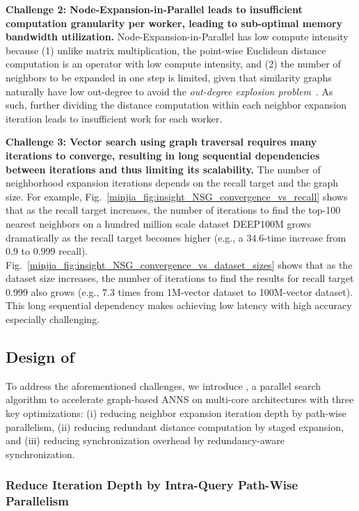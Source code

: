 \textbf{Challenge 2: Node-Expansion-in-Parallel leads to insufficient computation granularity per worker, leading to sub-optimal memory bandwidth utilization.} Node-Expansion-in-Parallel has low compute intensity because (1) unlike matrix multiplication, the point-wise Euclidean distance computation is an operator with low compute intensity, and (2) the number of neighbors to be expanded in one step is limited, given that similarity graphs naturally have low out-degree to avoid the \emph{out-degree explosion problem}~\cite{nsg}. As such, further dividing the distance computation within each neighbor expansion iteration leads to insufficient work for each worker. 

\textbf{Challenge 3: Vector search using graph traversal requires many iterations to converge, resulting in long sequential dependencies between iterations and thus limiting its scalability.}
The number of neighborhood expansion iterations depends on the recall target and the graph size. For example, 
Fig.~\ref{minjia_fig:insight_NSG_convergence_vs_recall} shows that as the recall target increases, the number of iterations to find the top-100 nearest neighbors on a hundred million scale dataset {DEEP100M} grows dramatically as the recall target becomes higher (e.g., a $34.6$-time increase from 0.9 to 0.999 recall). 
Fig.~\ref{minjia_fig:insight_NSG_convergence_vs_dataset_sizes} shows that as the dataset size increases, the number of iterations to find the results for recall target 0.999 also grows  (e.g., $7.3$ times from 1M-vector dataset to 100M-vector dataset). This long sequential dependency makes achieving low latency with high accuracy especially challenging. 

\subsection{Design of \Hammer}
\label{minjia_subsec:iqan-design}

To address the aforementioned challenges, we introduce \Hammer, a parallel search algorithm to accelerate graph-based ANNS on multi-core architectures with three key optimizations: (i) reducing neighbor expansion iteration depth by path-wise parallelism, (ii) reducing redundant distance computation by staged expansion, and (iii) reducing synchronization overhead by redundancy-aware synchronization. 

\subsubsection{Reduce Iteration Depth by Intra-Query Path-Wise Parallelism} 
\label{minjia_subsec:path-wise}



